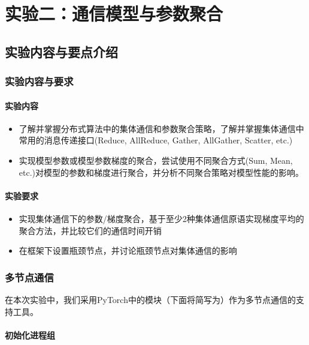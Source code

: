 \chapter{实验二：通信模型与参数聚合}

\section{实验内容与要点介绍}

\subsection{实验内容与要求}

\subsubsection{实验内容}
\begin{itemize}
    \item 了解并掌握分布式算法中的集体通信和参数聚合策略，了解并掌握集体通信中常用的消息传递接口(Reduce, AllReduce, Gather, AllGather, Scatter, etc.)
    \item 实现模型参数或模型参数梯度的聚合，尝试使用不同聚合方式(Sum, Mean, etc.)对模型的参数和梯度进行聚合，并分析不同聚合策略对模型性能的影响。    
\end{itemize}

\subsubsection{实验要求}
\begin{itemize}
    \item 实现集体通信下的参数/梯度聚合，基于至少2种集体通信原语实现梯度平均的聚合方法，并比较它们的通信时间开销
    \item 在框架下设置瓶颈节点，并讨论瓶颈节点对集体通信的影响
\end{itemize}

\subsection{多节点通信}

在本次实验中，我们采用PyTorch中的模块（下面将简写为）作为多节点通信的支持工具。

\subsubsection{初始化进程组}\label{subsubsec:task2-init-process-group}

